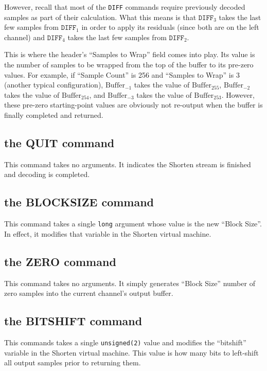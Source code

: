 However, recall that most of the \texttt{DIFF} commands require
previously decoded samples as part of their calculation.
What this means is that $\texttt{DIFF}_3$ takes the last
few samples from $\texttt{DIFF}_1$ in order to apply its residuals
(since both are on the left channel) and $\texttt{DIFF}_4$
takes the last few samples from $\texttt{DIFF}_2$.

This is where the header's ``Samples to Wrap'' field comes into play.
Its value is the number of samples to be wrapped from the top of the buffer
to its pre-zero values.
For example, if ``Sample Count'' is 256 and ``Samples to Wrap'' is 3
(another typical configuration),
$\text{Buffer}_{-1}$ takes the value of $\text{Buffer}_{255}$,
$\text{Buffer}_{-2}$ takes the value of $\text{Buffer}_{254}$, and
$\text{Buffer}_{-3}$ takes the value of $\text{Buffer}_{253}$.
However, these pre-zero starting-point values are obviously not
re-output when the buffer is finally completed and returned.

\subsection{the QUIT command}

This command takes no arguments.
It indicates the Shorten stream is finished and decoding is completed.

\subsection{the BLOCKSIZE command}

This command takes a single \texttt{long} argument
whose value is the new ``Block Size''.
In effect, it modifies that variable in the Shorten virtual machine.

\subsection{the ZERO command}

This command takes no arguments.
It simply generates ``Block Size'' number of zero samples
into the current channel's output buffer.

\subsection{the BITSHIFT command}

This commands takes a single \texttt{unsigned(2)} value
and modifies the ``bitshift'' variable in the Shorten virtual machine.
This value is how many bits to left-shift all output samples
prior to returning them.


